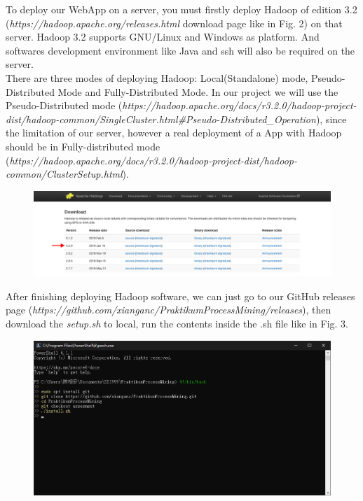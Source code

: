 \documentclass[runningheads]{llncs}
\begin{document}
\noindent
To deploy our WebApp on a server, you must firstly deploy Hadoop of edition 3.2 (\textit{https://hadoop.apache.org/releases.html} download page like in Fig. 2) on that server. Hadoop 3.2 supports GNU/Linux and Windows as platform. And softwares development environment like Java and ssh will also be required on the server.\\
\noindent
There are three modes of deploying Hadoop: Local(Standalone) mode, Pseudo-Distributed Mode and Fully-Distributed Mode. In our project we will use the Pseudo-Distributed mode (\textit{https://hadoop.apache.org/docs/r3.2.0/hadoop-project-dist/hadoop-common/SingleCluster.html\#Pseudo-Distributed\_Operation}), since the limitation of our server, however a real deployment of a App with Hadoop should be in Fully-distributed mode (\textit{https://hadoop.apache.org/docs/r3.2.0/hadoop-project-dist/hadoop-common/ClusterSetup.html}).

\begin{figure}[h]	
	\centering
	\includegraphics[scale=0.24]{apache.png}
	\caption{}
	\label{fig:label}
\end{figure}

\noindent
After finishing deploying Hadoop software, we can just go to our GitHub releases page (\textit{https://github.com/xianganc/PraktikumProcessMining/releases}), then download the \textit{setup.sh} to local, run the contents inside the .sh file like in Fig. 3.

\begin{figure}[h]	
	\centering
	\includegraphics[scale=0.3]{setup.png}
	\caption{}
	\label{fig:label}
\end{figure}
\end{document}
